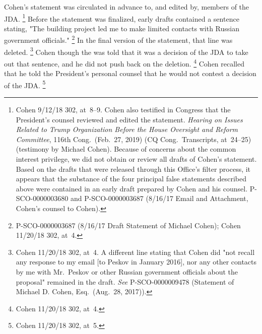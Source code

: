 Cohen's statement was circulated in advance to, and edited by, members of the JDA\null.%
\footnote{Cohen 9/12/18 302, at~8--9.
Cohen also testified in Congress that the President's counsel reviewed and edited the statement.
\textit{Hearing on Issues Related to Trump Organization Before the House Oversight and Reform Committee}, 116th Cong.\ (Feb.~27, 2019) (CQ Cong.\ Transcripts, at~24--25) (testimony by Michael Cohen).
Because of concerns about the common interest privilege, we did not obtain or review all drafts of Cohen's statement.
Based on the drafts that were released through this Office's filter process, it appears that the substance of the four principal false statements described above were contained in an early draft prepared by Cohen and his counsel.
P-SCO-0000003680 and P-SCO-0000003687 (8/16/17 Email and Attachment, Cohen's counsel to Cohen).}
Before the statement was finalized, early drafts contained a sentence stating, "The building project led me to make limited contacts with Russian government officials."%
\footnote{P-SCO-0000003687 (8/16/17 Draft Statement of Michael Cohen);
Cohen 11/20/18 302, at~4.}
In the final version of the statement, that line was deleted.%
\footnote{Cohen 11/20/18 302, at~4.
A different line stating that Cohen did "not recall any response to my email [to Peskov in January 2016], nor any other contacts by me with Mr.~Peskov or other Russian government officials about the proposal" remained in the draft.
\textit{See} P-SCO-0000009478 (Statement of Michael D. Cohen, Esq.\ (Aug.~28, 2017)).}
Cohen though the was told that it was a decision of the JDA to take out that sentence, and he did not push back on the deletion.%
\footnote{Cohen 11/20/18 302, at~4.}
Cohen recalled that he told the President's personal counsel that he would not contest a decision of the JDA\null.%
\footnote{Cohen 11/20/18 302, at~5.}

